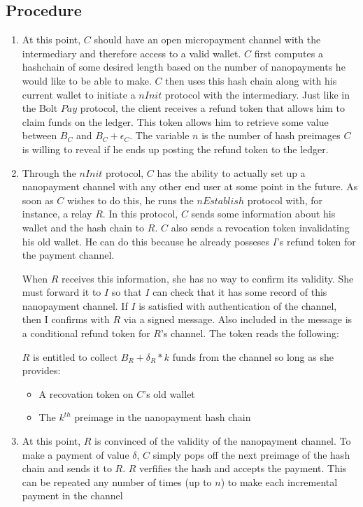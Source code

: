 \documentclass{article}
\begin{document}
\subsection{Procedure}
\begin{enumerate}
\item At this point, $C$ should have an open micropayment channel with the intermediary and therefore access to a valid wallet. $C$ first computes a hashchain of some desired length based on the number of nanopayments he would like to be able to make. $C$ then uses this hash chain along with his current wallet to initiate a $nInit$ protocol with the intermediary. Just like in the Bolt $Pay$ protocol, the client receives a refund token that allows him to claim funds on the ledger. This token allows him to retrieve some value between $B_C$ and $B_C + \epsilon_C$. The variable $n$ is the number of hash preimages $C$ is willing to reveal if he ends up posting the refund token to the ledger.

\item Through the $nInit$ protocol, $C$ has the ability to actually set up a nanopayment channel with any other end user at some point in the future. As soon as $C$ wishes to do this, he runs the $nEstablish$ protocol with, for instance, a relay $R$. In this protocol, $C$ sends some information about his wallet and the hash chain to $R$. $C$ also sends a revocation token invalidating his old wallet. He can do this because he already posseses $I$'s refund token for the payment channel.

When $R$ receives this information, she has no way to confirm its validity. She must forward it to $I$ so that $I$ can check that it has some record of this nanopayment channel. If $I$ is satisfied with authentication of the channel, then I confirms with $R$ via a signed message. Also included in the message is a conditional refund token for $R$'s channel. The token reads the following:

$R$ is entitled to collect $B_R + \delta_R * k$ funds from the channel so long as she provides:
\begin{itemize}
\item A recovation token on $C$'s old wallet
\item The $k^{th}$ preimage in the nanopayment hash chain
\end{itemize}

\item At this point, $R$ is convinced of the validity of the nanopayment channel. To make a payment  of value $\delta$, $C$ simply pops off the next preimage of the hash chain and sends it to $R$. $R$ verfifies the hash and accepts the payment. This can be repeated any number of times (up to $n$) to make each incremental payment in the channel


\end{enumerate}
\end{document}
